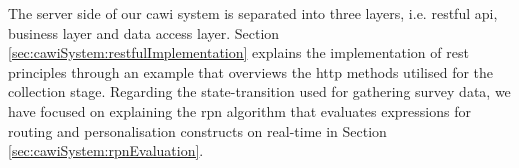 	The server side of our \gls{cawi} system is separated into three layers, i.e. \gls{rest}ful \gls{api}, business layer and data access layer. Section \ref{sec:cawiSystem:restfulImplementation} explains the implementation of \gls{rest} principles through an example that overviews the \gls{http} methods utilised for the collection stage. Regarding the state-transition used for gathering survey data, we have focused on explaining the \gls{rpn} algorithm that evaluates expressions for routing and personalisation constructs on real-time in Section \ref{sec:cawiSystem:rpnEvaluation}.